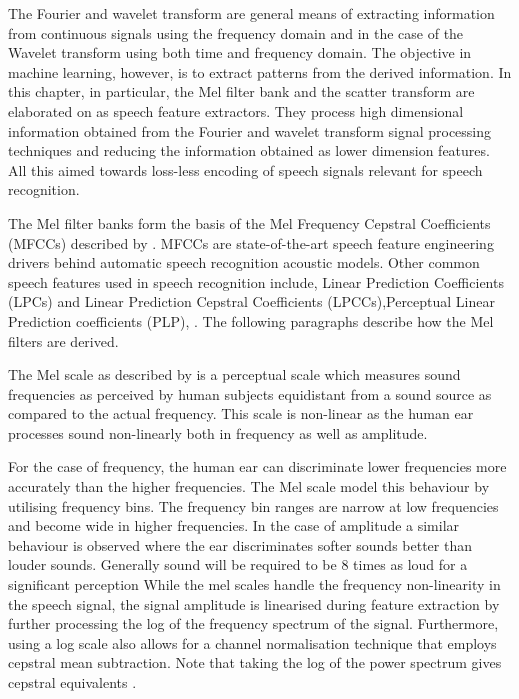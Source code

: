 The Fourier and wavelet transform are general means of extracting information from continuous signals using the frequency domain and in the case of the Wavelet transform using both time and frequency domain.  The objective in machine learning, however, is to extract patterns from the derived information.  In this chapter, in particular, the Mel filter bank and the scatter transform are elaborated on as speech feature extractors.  They process high dimensional information obtained from the Fourier and wavelet transform signal processing techniques and reducing the information obtained as lower dimension features.  All this aimed towards loss-less encoding of speech signals relevant for speech recognition.

The Mel filter banks form the basis of the Mel Frequency Cepstral Coefficients (MFCCs) described by \citep{davis1980comparison}.  MFCCs are state-of-the-art speech feature engineering drivers behind automatic speech recognition acoustic models.  Other common speech features used in speech recognition include, Linear Prediction Coefficients (LPCs) and Linear Prediction Cepstral Coefficients (LPCCs),Perceptual Linear Prediction coefficients (PLP),  \citep{mcloughlin2009applied, dines2010measuring}.  The following paragraphs describe how the Mel filters are derived. 

The Mel scale as described by \cite{stevens1937scale} is a perceptual scale which measures sound frequencies as perceived by human subjects equidistant from a sound source as compared to the actual frequency.  This scale is non-linear as the human ear processes sound non-linearly both in frequency as well as amplitude.

For the case of frequency, the human ear can discriminate lower frequencies more accurately than the higher frequencies.  The Mel scale model this behaviour by utilising frequency bins.  The frequency bin ranges are narrow at low frequencies and become wide in higher frequencies. In the case of amplitude a similar behaviour is observed where the ear discriminates softer sounds better than louder sounds.  Generally sound will be required to be 8 times as loud for a significant perception  While the mel scales handle the frequency non-linearity in the speech signal, the signal amplitude is linearised during feature extraction by further processing the log of the frequency spectrum of the signal.  Furthermore, using a log scale also allows for a channel normalisation technique that employs cepstral mean subtraction.  Note that taking  the log of the power spectrum gives cepstral equivalents \citep{becchetti1999behaviour}.

